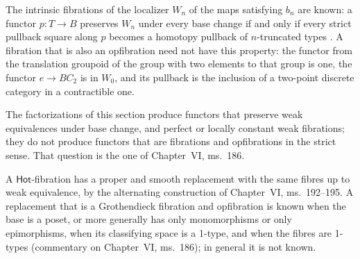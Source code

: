The intrinsic fibrations of the localizer $W_n$ of the maps satisfying $b_n$ are known: a functor $p:T\to B$ preserves $W_n$ under every base change if and only if every strict pullback square along $p$ becomes a homotopy pullback of $n$-truncated types \citep[Proposition~6.2.3 and \S9.2]{Cisinski2006}. A fibration that is also an opfibration need not have this property: the functor from the translation groupoid of the group with two elements to that group is one, the functor $e\to BC_2$ is in $W_0$, and its pullback is the inclusion of a two-point discrete category in a contractible one.

The factorizations of this section produce functors that preserve weak equivalences under base change, and perfect or locally constant weak fibrations; they do not produce functors that are fibrations and opfibrations in the strict sense. That question is the one of Chapter~VI, ms.~186.

A $\mathsf{Hot}$-fibration has a proper and smooth replacement with the same fibres up to weak equivalence, by the alternating construction of Chapter~VI, ms.~192--195. A replacement that is a Grothendieck fibration and opfibration is known when the base is a poset, or more generally has only monomorphisms or only epimorphisms, when its classifying space is a 1-type, and when the fibres are 1-types (commentary on Chapter~VI, ms.~186); in general it is not known.
